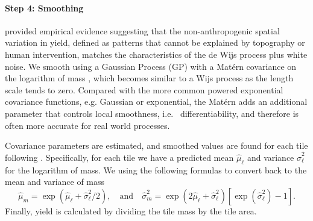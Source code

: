 \paragraph{Step 4: Smoothing} \cite{McCullagh2006} provided empirical
evidence suggesting that the non-anthropogenic spatial variation in
yield, defined as patterns that cannot be explained by topography or
human intervention, matches the characteristics of the de Wijs process
plus white noise. We smooth using a Gaussian Process (GP) with a
Mat\'ern covariance on the logarithm of mass
\citep{handcock1993bayesian,gutt2006studies}, which becomes similar to
a Wijs process as the length scale tends to zero. Compared with the
more common powered exponential covariance functions, e.g. Gaussian or
exponential, the Mat\'ern adds an additional parameter that controls
local smoothness, i.e. \ differentiability, and therefore is often
more accurate for real world processes.

Covariance parameters are estimated, and smoothed values are found for
each tile following \cite{Cressie1993}.  Specifically, for each tile
we have a predicted mean $\hat\mu_{\ell}$ and variance
$\hat\sigma^2_{\ell}$ for the logarithm of mass.  We using the
following formulas to convert back to the mean and variance of mass
\[ \hat{\mu}_{m} = \exp\left(\hat{\mu}_{\ell} +
\hat{\sigma}^2_{\ell}/2\right), \quad\mbox{and}\quad
\hat{\sigma}^2_{m} = \exp\left(2 \hat{\mu}_{\ell} +
\hat{\sigma}^2_{\ell}\right)
\left[\exp\left(\hat{\sigma}^2_{\ell}\right) - 1\right].
 \] Finally, yield is calculated by dividing the tile mass by the tile
area.


